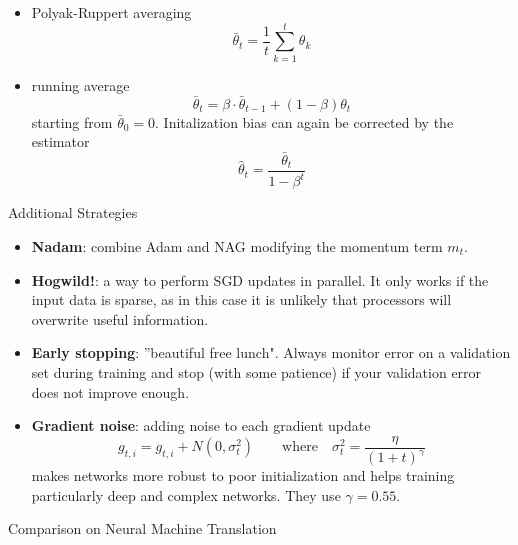 \documentclass[english]{article}
\begin{document}
\begin{itemize}
\item Polyak-Ruppert averaging
$$\bar{\theta}_t = \frac1t \sum_{k=1}^t \theta_k$$ 
\item running average
$$\bar{\theta}_t = \beta \cdot \bar{\theta}_{t-1} + (1-\beta) \theta_t $$
starting from $\bar{\theta}_0 = 0$. Initalization bias can again be corrected by the estimator 
$$\hat{\theta}_t = \frac{\bar{\theta}_t}{1-\beta^t}$$
\end{itemize}












\item {Additional Strategies}

\begin{itemize}
\item \textbf{Nadam}: combine Adam and NAG modifying the momentum term $m_t$.


\item \textbf{Hogwild!}: a way to perform SGD updates in parallel. It only works if the input data is sparse, as in this case it is unlikely that processors will overwrite useful information.


\item \textbf{Early stopping}: ''beautiful free lunch". Always monitor error on a validation set during training and stop (with some patience) if your validation error does not improve enough.


\item \textbf{Gradient noise}: adding noise to each gradient update
$$g_{t, i} = g_{t, i} + N(0, \sigma^2_t) \qquad\text{where}\quad \sigma^2_t = \frac{\eta}{(1+t)^\gamma}$$
makes networks more robust to poor initialization and helps training particularly deep and complex networks. They use $\gamma = 0.55$.
\end{itemize}








\item {Comparison on Neural Machine Translation}
\end{document}
